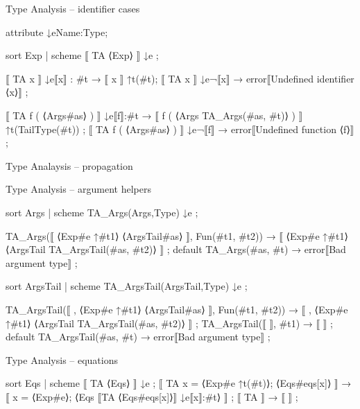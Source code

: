 \documentclass[pdftex,aspectratio=169,14pt]{beamer}
\begin{document}
\begin{frame}[fragile]{Type Analysis -- identifier cases}
\begin{hacs}
attribute ↓e{Name:Type};

sort Exp | scheme ⟦ TA ⟨Exp⟩ ⟧ ↓e ;

⟦ TA x ⟧ ↓e{⟦x⟧ : #t} →  ⟦ x ⟧ ↑t(#t);
⟦ TA x ⟧ ↓e{¬⟦x⟧} →  error⟦Undefined identifier ⟨x⟩⟧ ;

⟦ TA f ( ⟨Args#as⟩ ) ⟧ ↓e{⟦f⟧:#t}
  →  ⟦ f ( ⟨Args TA_Args(#as, #t)⟩ ) ⟧ ↑t(TailType(#t)) ;
⟦ TA f ( ⟨Args#as⟩ ) ⟧ ↓e{¬⟦f⟧} →  error⟦Undefined function ⟨f⟩⟧ ;
\end{hacs}
\end{frame}

\begin{frame}[fragile]{Type Analaysis -- propagation}
\end{frame}

\begin{frame}[fragile]{Type Analysis -- argument helpers}
\begin{hacs}
sort Args | scheme TA_Args(Args,Type) ↓e ;

TA_Args(⟦ ⟨Exp#e ↑#t1⟩ ⟨ArgsTail#as⟩ ⟧, Fun(#t1, #t2))
  →  ⟦ ⟨Exp#e ↑#t1⟩ ⟨ArgsTail TA_ArgsTail(#as, #t2)⟩ ⟧ ;
default TA_Args(#as, #t) →  error⟦Bad argument type⟧ ;

sort ArgsTail | scheme TA_ArgsTail(ArgsTail,Type) ↓e ;

TA_ArgsTail(⟦ , ⟨Exp#e ↑#t1⟩ ⟨ArgsTail#as⟩ ⟧, Fun(#t1, #t2))
  →  ⟦ , ⟨Exp#e ↑#t1⟩ ⟨ArgsTail TA_ArgsTail(#as, #t2)⟩ ⟧ ;
TA_ArgsTail(⟦ ⟧, #t1) →  ⟦ ⟧ ;
default TA_ArgsTail(#as, #t) →  error⟦Bad argument type⟧ ;
\end{hacs}
\end{frame}

\begin{frame}[fragile]{Type Analysis -- equations}
\begin{hacs}
sort Eqs | scheme ⟦ TA ⟨Eqs⟩ ⟧ ↓e ;
⟦ TA x = ⟨Exp#e ↑t(#t)⟩; ⟨Eqs#eqs[x]⟩ ⟧ →  ⟦ x = ⟨Exp#e⟩; ⟨Eqs ⟦TA ⟨Eqs#eqs[x]⟩⟧ ↓e{⟦x⟧:#t}⟩ ⟧ ;
⟦ TA ⟧ →  ⟦ ⟧ ;
\end{hacs}
\end{frame}
\end{document}
